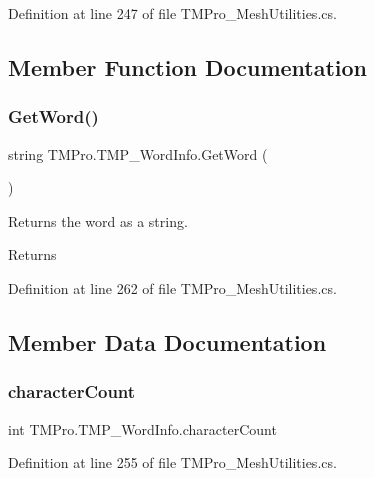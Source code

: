 Definition at line 247 of file T\+M\+Pro\+\_\+\+Mesh\+Utilities.\+cs.



\subsection{Member Function Documentation}
\mbox{\label{struct_t_m_pro_1_1_t_m_p___word_info_a18da9e9a1373dc163f1da528d23849b3}} 
\subsubsection{\texorpdfstring{GetWord()}{GetWord()}}
{\footnotesize\ttfamily string T\+M\+Pro.\+T\+M\+P\+\_\+\+Word\+Info.\+Get\+Word (\begin{DoxyParamCaption}{ }\end{DoxyParamCaption})}



Returns the word as a string. 

\begin{DoxyReturn}{Returns}

\end{DoxyReturn}


Definition at line 262 of file T\+M\+Pro\+\_\+\+Mesh\+Utilities.\+cs.



\subsection{Member Data Documentation}
\mbox{\label{struct_t_m_pro_1_1_t_m_p___word_info_a238e4a5e9fa4f36ba464e4167751d170}} 
\subsubsection{\texorpdfstring{characterCount}{characterCount}}
{\footnotesize\ttfamily int T\+M\+Pro.\+T\+M\+P\+\_\+\+Word\+Info.\+character\+Count}



Definition at line 255 of file T\+M\+Pro\+\_\+\+Mesh\+Utilities.\+cs.

